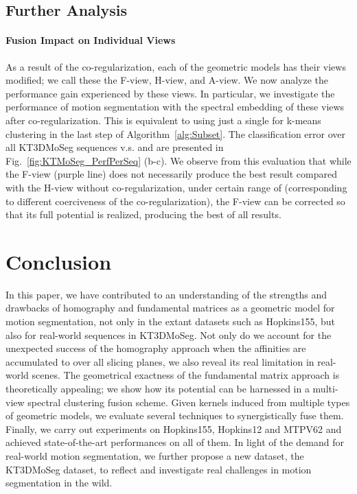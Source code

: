 \documentclass[10pt,twocolumn,letterpaper]{article}
\begin{document}
\subsection{Further Analysis}

\paragraph{Fusion Impact on Individual Views} As a result of the co-regularization, each of the geometric models has their views modified; we call these the F-view, H-view, and A-view. We now analyze the performance gain experienced by these views. In particular, we investigate the performance of motion segmentation with the spectral embedding of these views after co-regularization. This is equivalent to using just a single  for k-means clustering in the last step of Algorithm~\ref{alg:Subset}. The classification error over all KT3DMoSeg sequences v.s.  and  are presented in Fig.~\ref{fig:KTMoSeg_PerfPerSeq} (b-c). We observe from this evaluation that while the F-view (purple line) does not necessarily produce the best result compared with the H-view without co-regularization, under certain range of  (corresponding to different coerciveness of the co-regularization), the F-view can be corrected so that its full potential is realized, producing the best of all results. 









\vspace{-0.2cm}
\section{Conclusion}
In this paper, we have contributed to an understanding of the strengths and drawbacks of homography and fundamental matrices as a geometric model for motion segmentation, not only in the extant datasets such as Hopkins155, but also for real-world sequences in KT3DMoSeg. Not only do we account for the unexpected success of the homography approach when the affinities are accumulated to over all slicing planes, we also reveal its real limitation in real-world scenes. The geometrical exactness of the fundamental matrix approach is theoretically appealing; we show how its potential can be harnessed in a multi-view spectral clustering fusion scheme. Given kernels induced from multiple types of geometric models, we evaluate several techniques to synergistically fuse them. Finally, we carry out experiments on Hopkins155, Hopkins12  and MTPV62 and achieved state-of-the-art performances on all of them. In light of the demand for real-world motion segmentation, we further propose a new dataset, the KT3DMoSeg dataset, to reflect and investigate real challenges in motion segmentation in the wild.




{\small


}
\end{document}
